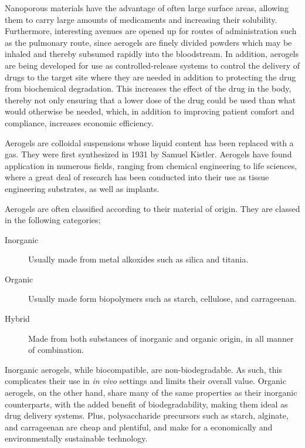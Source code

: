 \documentclass[a4paper,12pt]{article}
\begin{document}
Nanoporous materials have the advantage of often large surface areas, allowing them to carry large amounts of medicaments and increasing their solubility. Furthermore, interesting avenues are opened up for routes of administration such as the pulmonary route, since aerogels are finely divided powders which may be inhaled and thereby subsumed rapidly into the bloodstream. In addition, aerogels are being developed for use as controlled-release systems to control the delivery of drugs to the target site where they are needed in addition to protecting the drug from biochemical degradation. This increases the effect of the drug in the body, thereby not only ensuring that a lower dose of the drug could be used than what would otherwise be needed, which, in addition to improving patient comfort and compliance, increases economic efficiency.\supercite{vallet-regi_mesoporous_2007}

Aerogels are colloidal suspensions whose liquid content has been replaced with a gas. They were first synthesized in 1931 by Samuel Kistler.\supercite{ulker_emerging_2014} Aerogels have found application in numerous fields, ranging from chemical engineering to life sciences, where a great deal of research has been conducted into their use as tissue engineering substrates, as well as implants.\supercite{stergar_review_2016} 

Aerogels are often classified according to their material of origin. They are classed in the following categories\supercite{stergar_review_2016};

\begin{description}
	\item [Inorganic] Usually made from metal alkoxides such as silica and titania.
	\item [Organic] Usually made form biopolymers such as starch, cellulose, and carrageenan.
	\item [Hybrid] Made from both substances of inorganic and organic origin, in all manner of combination.

\end{description}

Inorganic aerogels, while biocompatible, are non-biodegradable. As such, this complicates
their use in \textit{in vivo} settings and limits their overall value. Organic aerogels, on the other hand, share many of the same properties as their inorganic counterparts, with the added benefit of biodegradability, making them ideal as drug delivery systems.\supercite{ulker_emerging_2014} Plus, polysaccharide precursors such as starch, alginate, and carrageenan are cheap and plentiful, and make for a economically and environmentally sustainable technology.\supercite{garcia-gonzalez_polysaccharide-based_2011} 
\end{document}
